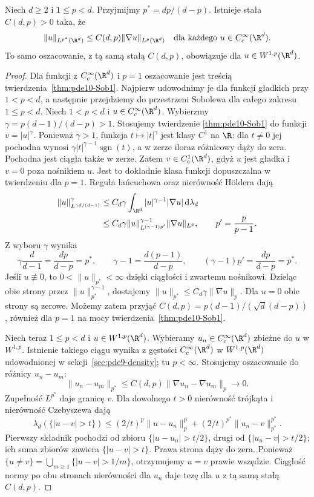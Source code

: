 \begin{twierdzenie}
\label{thm:pde10-Sobp}
Niech $d\ge2$ i $1\le p<d$. Przyjmijmy
$p^*=dp/(d-p)$. Istnieje stała $C(d,p)>0$ taka, że
\[
 \|u\|_{L^{p^*}(\R^d)}
 \le C(d,p)\|\nabla u\|_{L^p(\R^d)}
 \quad\text{dla każdego }u\in C_c^\infty(\R^d).
\]
To samo oszacowanie, z tą samą stałą $C(d,p)$,
obowiązuje dla $u\in W^{1,p}(\R^d)$.
\end{twierdzenie}
\begin{proof}
Dla funkcji z $C_c^\infty(\R^d)$ i $p=1$
oszacowanie jest treścią twierdzenia~\ref{thm:pde10-Sob1}.
Najpierw udowodnimy je dla funkcji gładkich przy
$1<p<d$, a następnie przejdziemy do przestrzeni Sobolewa
dla całego zakresu $1\le p<d$.
Niech $1<p<d$ i $u\in C_c^\infty(\R^d)$. Wybierzmy
$\gamma=p(d-1)/(d-p)>1$. Stosujemy twierdzenie
\ref{thm:pde10-Sob1} do funkcji
$v=|u|^\gamma$. Ponieważ $\gamma>1$, funkcja
$t\mapsto |t|^\gamma$ jest klasy $C^1$ na $\R$:
dla $t\ne0$ jej pochodna wynosi
$\gamma|t|^{\gamma-1}\operatorname{sgn}(t)$,
a w zerze iloraz różnicowy dąży do zera. Pochodna
jest ciągła także w zerze. Zatem $v\in C_c^1(\R^d)$,
gdyż $u$ jest gładka i $v=0$ poza nośnikiem $u$.
Jest to dokładnie klasa funkcji dopuszczalna w twierdzeniu
dla $p=1$.
Reguła łańcuchowa oraz nierówność H\"oldera dają
\begin{align*}
 \|u\|_{L^{\gamma d/(d-1)}}^\gamma
 &\le C_d\gamma\int_{\R^d}|u|^{\gamma-1}|\nabla u|
 \,\mathrm d\lambda_d\\
 &\le C_d\gamma
 \|u\|_{L^{(\gamma-1)p'}}^{\gamma-1}
 \|\nabla u\|_{L^p},\qquad p'=\frac p{p-1}.
\end{align*}
Z wyboru $\gamma$ wynika
\[
 \gamma\frac d{d-1}=\frac{dp}{d-p}=p^*,
 \qquad
 \gamma-1=\frac{d(p-1)}{d-p},
 \qquad
 (\gamma-1)p'=\frac{dp}{d-p}=p^*.
\]
Jeśli $u\not\equiv0$, to $0<\|u\|_{p^*}<\infty$
dzięki ciągłości i zwartemu nośnikowi. Dzieląc obie
strony przez $\|u\|_{p^*}^{\gamma-1}$, dostajemy
$\|u\|_{p^*}\le C_d\gamma\|\nabla u\|_p$.
Dla $u=0$ obie strony są zerowe. Możemy zatem przyjąć
$C(d,p)=p(d-1)/(\sqrt d(d-p))$, również dla $p=1$
na mocy twierdzenia~\ref{thm:pde10-Sob1}.

Niech teraz $1\le p<d$ i $u\in W^{1,p}(\R^d)$.
Wybieramy
$u_n\in C_c^\infty(\R^d)$ zbieżne do $u$ w $W^{1,p}$.
Istnienie takiego ciągu wynika z gęstości
$C_c^\infty(\R^d)$ w $W^{1,p}(\R^d)$ udowodnionej
w sekcji~\ref{sec:pde9-density}; tu $p<\infty$.
Stosujemy oszacowanie do różnicy $u_n-u_m$:
\[
 \|u_n-u_m\|_{p^*}
 \le C(d,p)\|\nabla u_n-\nabla u_m\|_p\longrightarrow0.
\]
Zupełność $L^{p^*}$ daje granicę $v$.
Dla dowolnego $t>0$ nierówność trójkąta i nierówność
Czebyszewa dają
\[
 \lambda_d(\{|u-v|>t\})
 \le (2/t)^p\|u-u_n\|_p^p
     +(2/t)^{p^*}\|u_n-v\|_{p^*}^{p^*}.
\]
Pierwszy składnik pochodzi od zbioru
$\{|u-u_n|>t/2\}$, drugi od $\{|u_n-v|>t/2\}$;
ich suma zbiorów zawiera $\{|u-v|>t\}$.
Prawa strona dąży do zera. Ponieważ
$\{u\ne v\}=\bigcup_{m\ge1}\{|u-v|>1/m\}$,
otrzymujemy $u=v$ prawie wszędzie.
Ciągłość normy po obu stronach nierówności dla $u_n$
daje tezę dla $u$ z tą samą stałą $C(d,p)$.
\end{proof}

